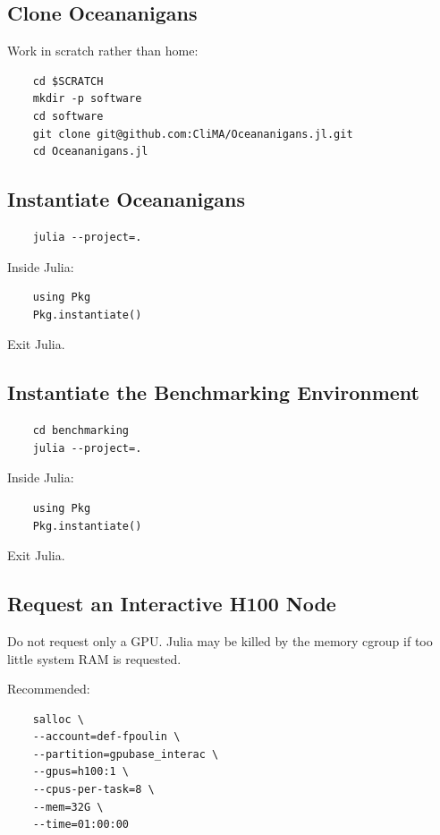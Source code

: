 \subsection{Clone Oceananigans} 

Work in scratch rather than home: 

\begin{verbatim} 
    cd $SCRATCH 
    mkdir -p software 
    cd software 
    git clone git@github.com:CliMA/Oceananigans.jl.git 
    cd Oceananigans.jl 
\end{verbatim} 

\subsection{Instantiate Oceananigans} 

\begin{verbatim} 
    julia --project=. 
\end{verbatim} 

Inside Julia: 

\begin{verbatim} 
    using Pkg 
    Pkg.instantiate() 
\end{verbatim} 

Exit Julia. 

\subsection{Instantiate the Benchmarking Environment} 

\begin{verbatim} 
    cd benchmarking 
    julia --project=. 
\end{verbatim} 

Inside Julia: 

\begin{verbatim} 
    using Pkg 
    Pkg.instantiate() 
\end{verbatim} 

Exit Julia. 

\subsection{Request an Interactive H100 Node} 

Do not request only a GPU. Julia may be killed by the memory cgroup if too little system RAM is requested. 

Recommended: 

\begin{verbatim} 
    salloc \ 
    --account=def-fpoulin \ 
    --partition=gpubase_interac \ 
    --gpus=h100:1 \ 
    --cpus-per-task=8 \ 
    --mem=32G \ 
    --time=01:00:00 
\end{verbatim} 

